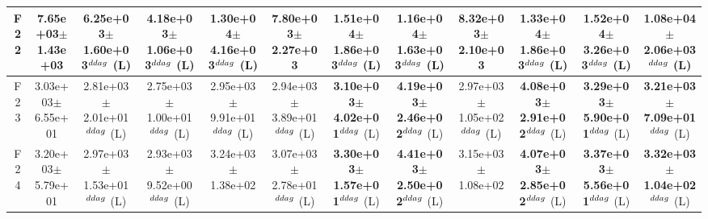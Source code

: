 \begin{table}[!t]
\begin{tabular}{c|ccccccccccc}
F22  & 7.65e+03$\pm$1.43e+03  & 6.25e+03$\pm$1.60e+03$^{\\ddag}$ (L)  & 4.18e+03$\pm$1.06e+03$^{\\ddag}$ (L)  & \textbf{1.30e+04$\pm$4.16e+03}$^{\\ddag}$ (L)  & 7.80e+03$\pm$2.27e+03   & \textbf{1.51e+04$\pm$1.86e+03}$^{\\ddag}$ (L)  & \textbf{1.16e+04$\pm$1.63e+03}$^{\\ddag}$ (L)  & 8.32e+03$\pm$2.10e+03   & \textbf{1.33e+04$\pm$1.86e+03}$^{\\ddag}$ (L)  & \textbf{1.52e+04$\pm$3.26e+03}$^{\\ddag}$ (L)  & \textbf{1.08e+04$\pm$2.06e+03}$^{\\ddag}$ (L) \\ \hline
F23  & 3.03e+03$\pm$6.55e+01  & 2.81e+03$\pm$2.01e+01$^{\\ddag}$ (L)  & 2.75e+03$\pm$1.00e+01$^{\\ddag}$ (L)  & 2.95e+03$\pm$9.91e+01$^{\\ddag}$ (L)  & 2.94e+03$\pm$3.89e+01$^{\\ddag}$ (L)  & \textbf{3.10e+03$\pm$4.02e+01}$^{\\ddag}$ (L)  & \textbf{4.19e+03$\pm$2.46e+02}$^{\\ddag}$ (L)  & 2.97e+03$\pm$1.05e+02$^{\\ddag}$ (L)  & \textbf{4.08e+03$\pm$2.91e+02}$^{\\ddag}$ (L)  & \textbf{3.29e+03$\pm$5.90e+01}$^{\\ddag}$ (L)  & \textbf{3.21e+03$\pm$7.09e+01}$^{\\ddag}$ (L) \\ \hline
F24  & 3.20e+03$\pm$5.79e+01  & 2.97e+03$\pm$1.53e+01$^{\\ddag}$ (L)  & 2.93e+03$\pm$9.52e+00$^{\\ddag}$ (L)  & 3.24e+03$\pm$1.38e+02   & 3.07e+03$\pm$2.78e+01$^{\\ddag}$ (L)  & \textbf{3.30e+03$\pm$1.57e+01}$^{\\ddag}$ (L)  & \textbf{4.41e+03$\pm$2.50e+02}$^{\\ddag}$ (L)  & 3.15e+03$\pm$1.08e+02   & \textbf{4.07e+03$\pm$2.85e+02}$^{\\ddag}$ (L)  & \textbf{3.37e+03$\pm$5.56e+01}$^{\\ddag}$ (L)  & \textbf{3.32e+03$\pm$1.04e+02}$^{\\ddag}$ (L) \\ \hline

\end{tabular}
\end{table}
